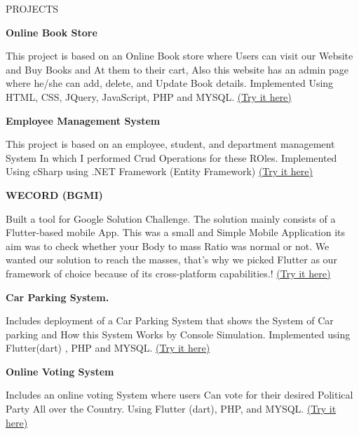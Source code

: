 \documentclass{resume}
\begin{document}
\begin{rSection}{PROJECTS}
\vspace{-1.25em}

\item \textbf{Online Book Store}\itemsep -3pt {} 
     \item {This project is based on an Online Book store where Users can visit our Website and Buy Books and At them to their cart, Also this website has an admin page where he/she can add, delete, and Update Book details.
Implemented Using HTML, CSS, JQuery, JavaScript, PHP and MYSQL.
}
\href{https://github.com/GurusGeek/Online-Book-Store}{(Try it here)}

\item \textbf{Employee Management System} 
\itemsep -3pt {} 
     \item {This project is based on an employee, student, and department management System In which I performed Crud Operations for these ROles.
Implemented Using cSharp using .NET Framework (Entity Framework)
}
\href{https://github.com/GurusGeek/Student-Department-employee-Managment-System}{(Try it here)}

\item \textbf{WECORD (BGMI)} \itemsep -3pt {} 
     \item {Built a tool for Google Solution Challenge. The solution mainly consists of a Flutter-based mobile App.
This was a small and Simple Mobile Application its aim was to check whether your Body to mass Ratio was normal or not. We wanted our solution to reach the masses, that's why we picked Flutter as our framework of choice because of its cross-platform capabilities.! \href{https://github.com/GurusGeek/project}{(Try it here)}}
\item \textbf{Car Parking System.} \itemsep -3pt {} 
     \item {Includes deployment of a Car Parking System that shows the System of Car parking and  How this System Works by Console Simulation.
Implemented using Flutter(dart) , PHP and MYSQL.}
\href{https://github.com/GurusGeek/CAR-PARKING_SYSTEM}{(Try it here)}

\item \textbf{Online Voting System}  \itemsep -3pt {} 
     \item {Includes an online voting System where users Can vote for their desired Political Party All over the Country. Using Flutter (dart), PHP, and MYSQL.
}
\href{https://github.com/GurusGeek/online-voting-system}{(Try it here)}
\end{rSection} 
\end{document}
